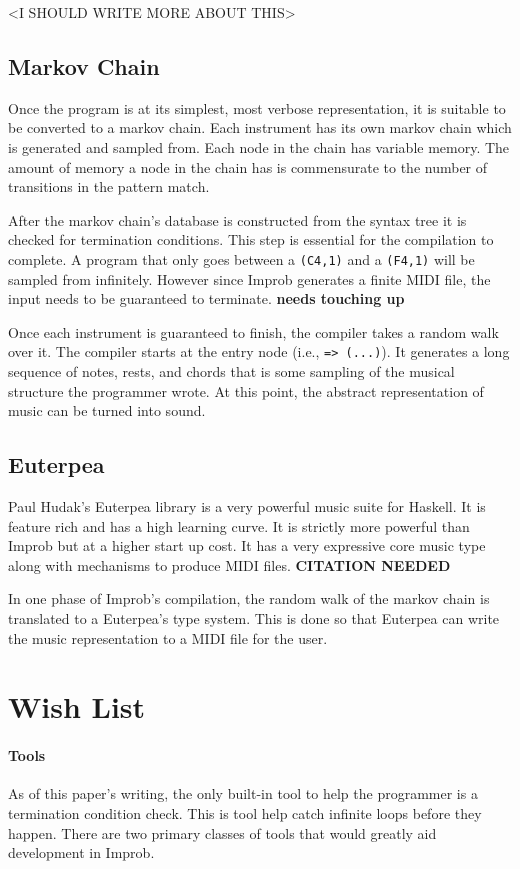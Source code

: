 \documentclass{sigplanconf-pldi15}
\begin{document}
<I SHOULD WRITE MORE ABOUT THIS>

\subsection{Markov Chain}
Once the program is at its simplest, most verbose representation, it is suitable to be converted to a markov chain. Each instrument has its own markov chain which is generated and sampled from. Each node in the chain has variable memory. The amount of memory a node in the chain has is commensurate to the number of transitions in the pattern match.

After the markov chain's database is constructed from the syntax tree it is checked for termination conditions. This step is essential for the compilation to complete. A program that only goes between a \texttt{(C4,1)} and a \texttt{(F4,1)} will be sampled from infinitely. However since Improb generates a finite MIDI file, the input needs to be guaranteed to terminate. \textbf{needs touching up}

Once each instrument is guaranteed to finish, the compiler takes a random walk over it. The compiler starts at the entry node (i.e., \texttt{=> (...)}). It generates a long sequence of notes, rests, and chords that is some sampling of the musical structure the programmer wrote. At this point, the abstract representation of music can be turned into sound.

\subsection{Euterpea}
Paul Hudak's Euterpea library is a very powerful music suite for Haskell. It is feature rich and has a high learning curve. It is strictly more powerful than Improb but at a higher start up cost. It has a very expressive core music type along with mechanisms to produce MIDI files.
\textbf{CITATION NEEDED}

In one phase of Improb's compilation, the random walk of the markov chain is translated to a Euterpea's type system. This is done so that Euterpea can write the music representation to a MIDI file for the user.

\section{Wish List}
\paragraph{Tools}
As of this paper's writing, the only built-in tool to help the programmer is a termination condition check. This is tool help catch infinite loops before they happen. There are two primary classes of tools that would greatly aid development in Improb.
\end{document}
